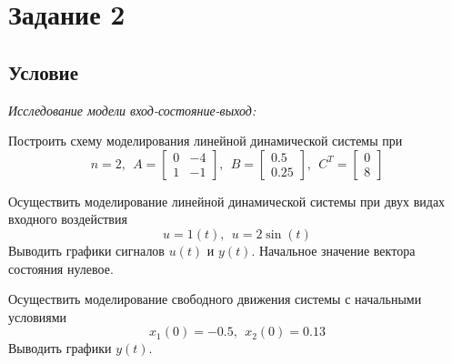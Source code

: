 \documentclass[a4paper, 12pt]{article}
\begin{document}
    \section{Задание 2}
    \subsection{Условие}
    \textit{Исследование модели вход-состояние-выход:}
    \begin{compactitem}
    \item Построить схему моделирования линейной динамической системы при
    $$n=2,\ \
    A=
    \begin{bmatrix}
        0 & -4\\
        1 & -1
    \end{bmatrix},\ \
    B=
    \begin{bmatrix}
        0.5\\
        0.25
    \end{bmatrix},\ \
    C^T=
    \begin{bmatrix}
        0\\
        8
    \end{bmatrix}$$
    \item Осуществить моделирование линейной динамической системы при двух видах входного воздействия
    $$u=1(t),\ \ u=2\sin{(t)}$$ Выводить графики
    сигналов $u(t)$ и $y(t)$. Начальное значение вектора состояния нулевое.
    \item Осуществить моделирование свободного движения системы с начальными условиями
    $$x_1(0)=-0.5,\ \ x_2(0)=0.13$$ Выводить графики $y(t)$.
    \end{compactitem}
\end{document}
